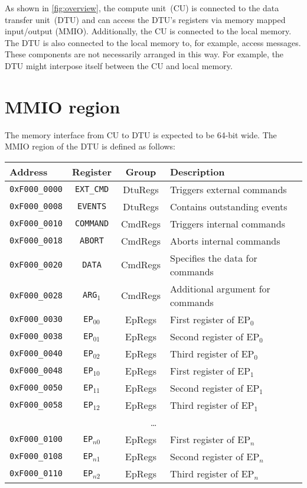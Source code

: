 \documentclass[a4paper,11pt,draft]{article}
\newcommand{\rref}[2][]{\autoref{#2}}
\begin{document}
As shown in \rref{fig:overview}, the compute unit~(CU) is connected to the data transfer unit~(DTU)
and can access the DTU's registers via memory mapped input/output (MMIO). Additionally, the CU is
connected to the local memory. The DTU is also connected to the local memory to, for example, access
messages. These components are not necessarily arranged in this way. For example, the DTU might
interpose itself between the CU and local memory.

\section{MMIO region}

The memory interface from CU to DTU is expected to be 64-bit wide. The MMIO region of the DTU is
defined as follows:

\vspace{2ex}
\noindent
\begin{tabular}{ p{3cm} | c | c | l }
  \textbf{Address} & \textbf{Register} & \textbf{Group} & \textbf{Description} \\
  \hline
  \texttt{0xF000\_0000} & \texttt{EXT\_CMD} & DtuRegs & Triggers external commands \\
  \hline
  \texttt{0xF000\_0008} & \texttt{EVENTS} & DtuRegs & Contains outstanding events \\
  \hline
  \texttt{0xF000\_0010} & \texttt{COMMAND} & CmdRegs & Triggers internal commands \\
  \hline
  \texttt{0xF000\_0018} & \texttt{ABORT} & CmdRegs & Aborts internal commands \\
  \hline
  \texttt{0xF000\_0020} & \texttt{DATA} & CmdRegs & Specifies the data for commands \\
  \hline
  \texttt{0xF000\_0028} & \texttt{ARG$_1$} & CmdRegs & Additional argument for commands \\
  \hline
  \texttt{0xF000\_0030} & \texttt{EP$_{00}$} & EpRegs & First register of EP$_0$ \\
  \texttt{0xF000\_0038} & \texttt{EP$_{01}$} & EpRegs & Second register of EP$_0$ \\
  \texttt{0xF000\_0040} & \texttt{EP$_{02}$} & EpRegs & Third register of EP$_0$ \\
  \hline
  \texttt{0xF000\_0048} & \texttt{EP$_{10}$} & EpRegs & First register of EP$_1$ \\
  \texttt{0xF000\_0050} & \texttt{EP$_{11}$} & EpRegs & Second register of EP$_1$ \\
  \texttt{0xF000\_0058} & \texttt{EP$_{12}$} & EpRegs & Third register of EP$_1$ \\
  \hline
  \multicolumn{4}{c}{\dots} \\
  \hline
  \texttt{0xF000\_0100} & \texttt{EP$_{n0}$} & EpRegs & First register of EP$_{n}$ \\
  \texttt{0xF000\_0108} & \texttt{EP$_{n1}$} & EpRegs & Second register of EP$_{n}$ \\
  \texttt{0xF000\_0110} & \texttt{EP$_{n2}$} & EpRegs & Third register of EP$_{n}$ \\
\end{tabular}
\end{document}
